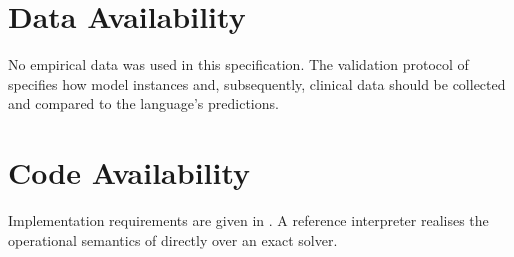 \documentclass[11pt,a4paper]{article}
\theoremstyle{cfcthm}
\theoremstyle{definition}
\theoremstyle{remark}
\begin{document}
\section*{Data Availability}
No empirical data was used in this specification. The validation protocol of
 specifies how model instances and, subsequently, clinical
data should be collected and compared to the language's predictions.

\section*{Code Availability}
Implementation requirements are given in . A reference
interpreter realises the operational semantics of  directly over
an exact solver.



\end{document}

